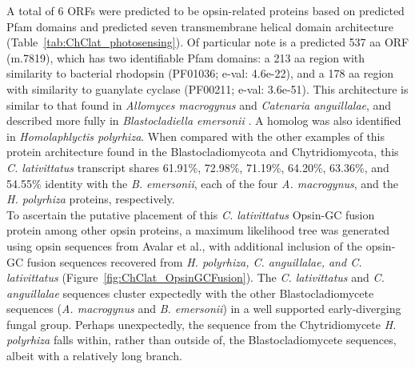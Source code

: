 \indent A total of 6 ORFs were predicted to be opsin-related proteins based on predicted Pfam domains and predicted seven transmembrane helical domain architecture (Table~\ref{tab:ChClat_photosensing}). Of particular note is a predicted 537 aa ORF (m.7819), which has two identifiable Pfam domains: a 213 aa region with similarity to bacterial rhodopsin (PF01036; e-val: 4.6e-22), and a 178 aa region with similarity to guanylate cyclase (PF00211; e-val: 3.6e-51). This architecture is similar to that found in \textit{Allomyces macrogynus} and \textit{Catenaria anguillalae}, and described more fully in \textit{Blastocladiella emersonii} \cite{Avelar2014}. A homolog was also identified in \textit{Homolaphlyctis polyrhiza}. When compared with the other examples of this protein architecture found in the Blastocladiomycota and Chytridiomycota, this \textit{C. lativittatus} transcript shares 61.91\%, 72.98\%, 71.19\%, 64.20\%, 63.36\%, and 54.55\% identity with the \textit{B. emersonii}, each of the four \textit{A. macrogynus}, and the \textit{H. polyrhiza} proteins, respectively.\\
\indent To ascertain the putative placement of this \textit{C. lativittatus} Opsin-GC fusion protein among other opsin proteins, a maximum likelihood tree was generated using opsin sequences from Avalar et al., with additional inclusion of the opsin-GC fusion sequences recovered from \textit{H. polyrhiza, C. anguillalae, and C. lativittatus} (Figure~\ref{fig:ChClat_OpsinGCFusion}). The \textit{C. lativittatus} and \textit{C. anguillalae} sequences cluster expectedly with the other Blastocladiomycete sequences (\textit{A. macrogynus} and \textit{B. emersonii}) in a well supported early-diverging fungal group. Perhaps unexpectedly, the sequence from the Chytridiomycete \textit{H. polyrhiza} falls within, rather than outside of, the Blastocladiomycete sequences, albeit with a relatively long branch.\\

